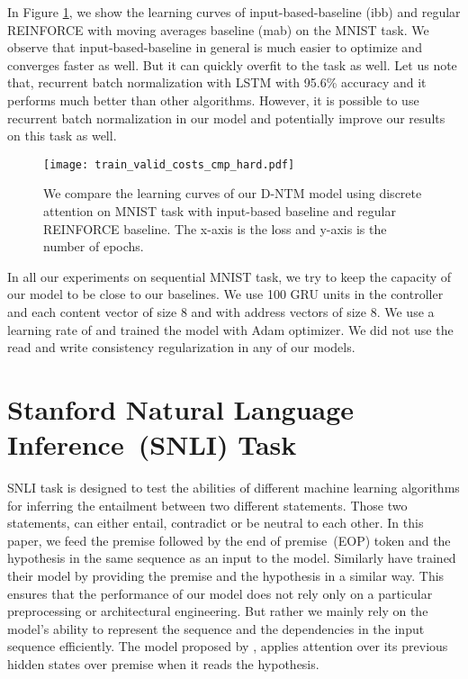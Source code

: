 \documentclass[12pt]{article}
\begin{document}
In Figure \ref{fig:dntm_reinforce_baselines_cmp}, we show the learning curves of input-based-baseline (ibb) and regular REINFORCE with moving averages baseline (mab) on the MNIST task. We observe that input-based-baseline in general is much easier to optimize and converges faster as well. But it can quickly overfit to the task as well. Let us note that, recurrent batch normalization with LSTM \citep{cooijmans2016recurrent} with 95.6\% accuracy and it performs much better than other algorithms. However, it is possible to use recurrent batch normalization in our model and potentially improve our results on this task as well.

\begin{figure}[htbp]
\centering
\texttt{[image: train\_valid\_costs\_cmp\_hard.pdf]}
\caption{We compare the learning curves of our D-NTM model using discrete attention on MNIST task with input-based baseline and regular REINFORCE baseline. The x-axis is the loss and y-axis is the number of epochs.}
\label{fig:dntm_reinforce_baselines_cmp}
\end{figure}

In all our experiments on sequential MNIST task, we try to keep the capacity of our model to be close to our baselines. We use  100 GRU units in the controller and each content vector of size 8 and with address vectors of size 8. We use a learning rate of  and trained the model with Adam optimizer. We did not use the read and write consistency regularization in any of our models.

\section{Stanford Natural Language Inference~(SNLI) Task}

SNLI task \citep{bowman2015large} is designed to test the abilities of different machine learning algorithms for inferring the entailment between two different statements. Those two statements, can either entail, contradict or be neutral to each other. In this paper, we feed the premise followed by the end of premise~(EOP) token and the hypothesis in the same sequence as an input to the model. Similarly \cite{rocktaschel2015reasoning} have trained their model by providing the premise and the hypothesis in a similar way. This ensures that the performance of our model does not rely only on a particular preprocessing or architectural engineering. But rather we mainly rely on the model's ability to represent the sequence and the dependencies in the input sequence efficiently. The model proposed by \cite{rocktaschel2015reasoning}, applies attention over its previous hidden states over premise when it reads the hypothesis.
\end{document}
